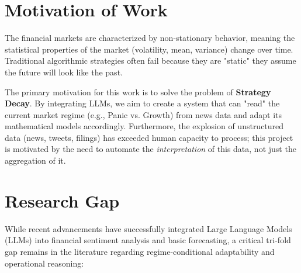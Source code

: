 \documentclass[12pt, a4paper]{report}
\begin{document}
\section{Motivation of Work}
The financial markets are characterized by non-stationary behavior, meaning the statistical properties of the market (volatility, mean, variance) change over time. Traditional algorithmic strategies often fail because they are "static" they assume the future will look like the past.

The primary motivation for this work is to solve the problem of \textbf{Strategy Decay}. By integrating LLMs, we aim to create a system that can "read" the current market regime (e.g., Panic vs. Growth) from news data and adapt its mathematical models accordingly. Furthermore, the explosion of unstructured data (news, tweets, filings) has exceeded human capacity to process; this project is motivated by the need to automate the \textit{interpretation} of this data, not just the aggregation of it.


\section{Research Gap}

While recent advancements have successfully integrated Large Language Models (LLMs) into financial sentiment analysis and basic forecasting, a critical tri-fold gap remains in the literature regarding regime-conditional adaptability and operational reasoning:
\end{document}
